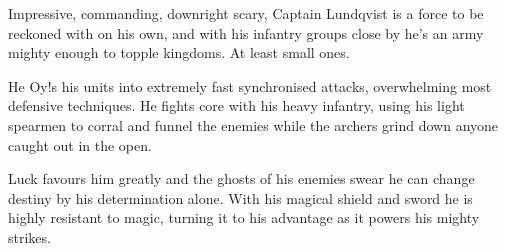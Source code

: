 Impressive, commanding, downright scary, Captain Lundqvist is a force to be reckoned with on his own, and with his infantry groups close by he's an army mighty enough to topple kingdoms. At least small ones.

He Oy!s his units into extremely fast synchronised attacks, overwhelming most defensive techniques. He fights core with his heavy infantry, using his light spearmen to corral and funnel the enemies while the archers grind down anyone caught out in the open.

Luck favours him greatly and the ghosts of his enemies swear he can change destiny by his determination alone. With his magical shield and sword he is highly resistant to magic, turning it to his advantage as it powers his mighty strikes.


\

